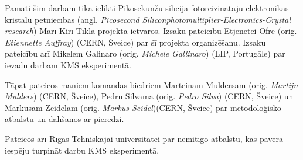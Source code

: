 Pamati šim darbam tika ielikti Pikosekunžu silīcija fotoreizinātāju-elektronikas-kristālu pētniecības (angl. \textit{Picosecond Siliconphotomultiplier-Electronics-Crystal research}) Marī Kirī Tīkla projekta ietvaros. Izsaku pateicību Etjenetei Ofrē (orig. \textit{Etiennette Auffray}) (CERN, Šveice) par šī projekta organizēšanu. Izsaku pateicību arī Mikelem Galinaro (orig. \textit{Michele Gallinaro}) (LIP, Portugāle) par ievadu darbam KMS eksperimentā.

Tāpat pateicos maniem komandas biedriem Marteinam Muldersam (orig. \textit{Martijn Mulders}) (CERN, Šveice), Pedru Silvama (orig. \textit{Pedro Silva}) (CERN, Šveice) un  Markusam Zeidelam (orig. \textit{Markus Seidel})(CERN, Šveice) par metodoloģisko atbalstu un dalīšanos ar pieredzi.

Pateicos arī Rīgas Tehniskajai universitātei par nemitīgo atbalstu, kas pavēra iespēju turpināt darbu KMS eksperimentā.
